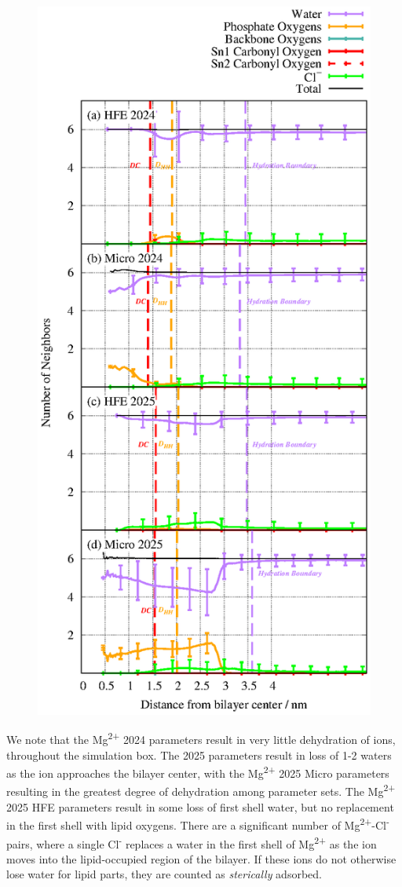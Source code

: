 \documentclass[journal=langd5,manuscript=article]{achemso}
\newcommand{\mg}{Mg\textsuperscript{2+}}
\newcommand{\cl}{Cl\textsuperscript{-}}
\begin{document}
\begin{figure}[H]
\includegraphics[height=0.5\textheight]{../figures/Figure_2.eps}
\end{figure}
We note that the \mg{ 2024} parameters result in very little dehydration of ions, throughout the simulation box. The 2025 parameters result in loss of 1-2 waters as the ion approaches the bilayer center, with the \mg{ 2025} Micro parameters resulting in the greatest degree of dehydration among parameter sets.
The \mg{ 2025} HFE parameters result in some loss of first shell water, but no replacement in the first shell with lipid oxygens. There are a significant number of \mg{}-\cl{} pairs, where a single \cl{} replaces a water
in the first shell of \mg{} as the ion moves into the lipid-occupied region of the bilayer. If these ions do not otherwise lose water for lipid parts, 
they are counted as \emph{sterically} adsorbed.
\end{document}
